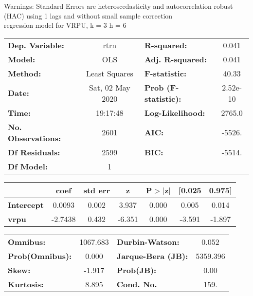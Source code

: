 Warnings: \newline
 [1] Standard Errors are heteroscedasticity and autocorrelation robust (HAC) using 1 lags and without small sample correction\\ 

regression model for VRPU, k = 3 h = 6\begin{center}
\begin{tabular}{lclc}
\toprule
\textbf{Dep. Variable:}    &       rtrn       & \textbf{  R-squared:         } &     0.041   \\
\textbf{Model:}            &       OLS        & \textbf{  Adj. R-squared:    } &     0.041   \\
\textbf{Method:}           &  Least Squares   & \textbf{  F-statistic:       } &     40.33   \\
\textbf{Date:}             & Sat, 02 May 2020 & \textbf{  Prob (F-statistic):} &  2.52e-10   \\
\textbf{Time:}             &     19:17:48     & \textbf{  Log-Likelihood:    } &    2765.0   \\
\textbf{No. Observations:} &        2601      & \textbf{  AIC:               } &    -5526.   \\
\textbf{Df Residuals:}     &        2599      & \textbf{  BIC:               } &    -5514.   \\
\textbf{Df Model:}         &           1      & \textbf{                     } &             \\
\bottomrule
\end{tabular}
\begin{tabular}{lcccccc}
                   & \textbf{coef} & \textbf{std err} & \textbf{z} & \textbf{P$> |$z$|$} & \textbf{[0.025} & \textbf{0.975]}  \\
\midrule
\textbf{Intercept} &       0.0093  &        0.002     &     3.937  &         0.000        &        0.005    &        0.014     \\
\textbf{vrpu}      &      -2.7438  &        0.432     &    -6.351  &         0.000        &       -3.591    &       -1.897     \\
\bottomrule
\end{tabular}
\begin{tabular}{lclc}
\textbf{Omnibus:}       & 1067.683 & \textbf{  Durbin-Watson:     } &    0.052  \\
\textbf{Prob(Omnibus):} &   0.000  & \textbf{  Jarque-Bera (JB):  } & 5359.396  \\
\textbf{Skew:}          &  -1.917  & \textbf{  Prob(JB):          } &     0.00  \\
\textbf{Kurtosis:}      &   8.895  & \textbf{  Cond. No.          } &     159.  \\
\bottomrule
\end{tabular}
\end{center}

